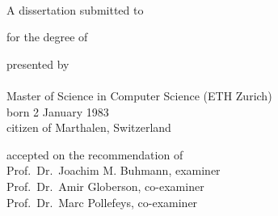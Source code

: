 \begin{titlepage}
    \begin{center}
        \large
        \begingroup
        \endgroup

        \hfill

        \vfill

        \begingroup
            \spacedallcaps{\myTitleOnTitlePageLineOne}\\
            \spacedallcaps{\myTitleOnTitlePageLineTwo}
        \endgroup

        \vfill

        \begingroup
            A dissertation submitted to\\
        \endgroup
        
        \vfill

        \begingroup
            for the degree of\\
        \endgroup

        \vfill

        \begingroup
            presented by\\
            \spacedlowsmallcaps{\myName}\\
            Master of Science in Computer Science (ETH Zurich)\\
            born 2 January 1983\\
            citizen of Marthalen, Switzerland
        \endgroup

        \vfill

        \begingroup
            accepted on the recommendation of\\
            Prof.\ Dr.\ Joachim M. Buhmann, examiner\\
            Prof.\ Dr.\ Amir Globerson, co-examiner\\
            Prof.\ Dr.\ Marc Pollefeys, co-examiner
        \endgroup


        \vfill

        \myTime

        \vfill                      

    \end{center}  
\end{titlepage}   
